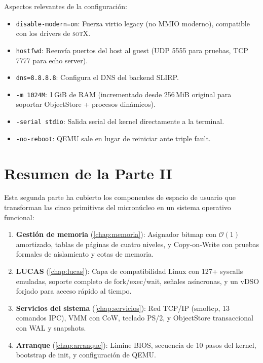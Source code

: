 \documentclass[11pt,twoside,openright]{book}
\theoremstyle{definition}
\theoremstyle{plain}
\theoremstyle{remark}
\newcommand{\sotos}{\textsc{sotX}}
\newcommand{\bigO}{\mathcal{O}}
\begin{document}
Aspectos relevantes de la configuración:
\begin{itemize}
    \item \texttt{disable-modern=on}: Fuerza virtio legacy (no MMIO moderno),
          compatible con los drivers de \sotos{}.
    \item \texttt{hostfwd}: Reenvía puertos del host al guest (UDP 5555 para
          pruebas, TCP 7777 para echo server).
    \item \texttt{dns=8.8.8.8}: Configura el DNS del backend SLIRP.
    \item \texttt{-m 1024M}: 1\,GiB de RAM (incrementado desde 256\,MiB original
          para soportar ObjectStore + procesos dinámicos).
    \item \texttt{-serial stdio}: Salida serial del kernel directamente a la terminal.
    \item \texttt{-no-reboot}: QEMU sale en lugar de reiniciar ante triple fault.
\end{itemize}

\section{Resumen de la Parte II}

Esta segunda parte ha cubierto los componentes de espacio de usuario que
transforman las cinco primitivas del micronúcleo en un sistema operativo
funcional:

\begin{enumerate}
    \item \textbf{Gestión de memoria} (\cref{chap:memoria}): Asignador bitmap
          con $\bigO(1)$ amortizado, tablas de páginas de cuatro niveles, y
          Copy-on-Write con pruebas formales de aislamiento y cotas de memoria.

    \item \textbf{LUCAS} (\cref{chap:lucas}): Capa de compatibilidad Linux con
          127+ syscalls emuladas, soporte completo de fork/exec/wait, señales
          asíncronas, y un vDSO forjado para acceso rápido al tiempo.

    \item \textbf{Servicios del sistema} (\cref{chap:servicios}): Red TCP/IP
          (smoltcp, 13 comandos IPC), VMM con CoW, teclado PS/2, y ObjectStore
          transaccional con WAL y snapshots.

    \item \textbf{Arranque} (\cref{chap:arranque}): Limine BIOS, secuencia de
          10 pasos del kernel, bootstrap de init, y configuración de QEMU.
\end{enumerate}
\end{document}
